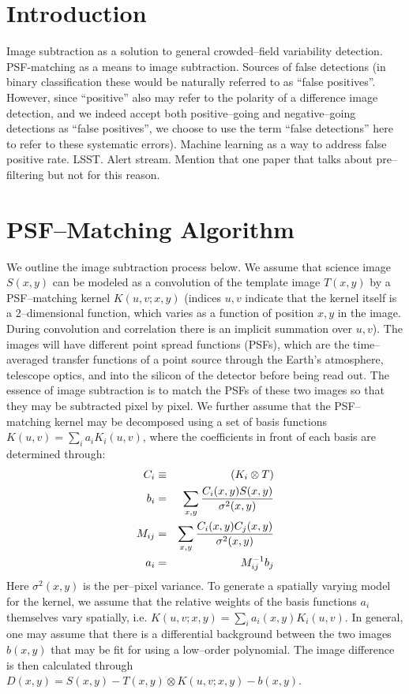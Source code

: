 \documentclass[floatfix, apj]{emulateapj}
\begin{document}

\section{Introduction}

Image subtraction as a solution to general crowded--field variability detection.
PSF-matching as a means to image subtraction.
Sources of false detections (in binary classification these would be naturally referred to as ``false positives''.  However, since ``positive'' also may refer to the polarity of a difference image detection, and we indeed accept both positive--going and negative--going detections as ``false positives'', we choose to use the term ``false detections'' here to refer to these systematic errors).
Machine learning as a way to address false positive rate.
LSST.
Alert stream.
Mention that one paper that talks about pre--filtering but not for this reason.

\section{PSF--Matching Algorithm}

We outline the image subtraction process below.
We assume that science image $S(x,y)$ can be modeled as a convolution of the template image $T(x,y)$ by a PSF--matching kernel $K(u,v;x,y)$ (indices $u,v$ indicate that the kernel itself is a 2--dimensional function, which varies as a function of position $x,y$ in the image.
During convolution and correlation there is an implicit summation over $u,v$).
The images will have different point spread functions (PSFs), which are the time--averaged transfer functions of a point source through the Earth's atmosphere, telescope optics, and into the silicon of the detector before being read out.
The essence of image subtraction is to match the PSFs of these two images so that they may be subtracted pixel by pixel.
We further assume that the PSF--matching kernel may be decomposed using a set of basis functions $K(u,v) = \sum_i a_i K_i(u,v)$, where the coefficients in front of each basis are determined through:
\begin{eqnarray}
\label{eq-soln}
C_i & \equiv & (K_i \otimes T) \\ 
b_{i}  & = & \sum_{x,y} {{C_i(x,y) S(x,y)}\over{\sigma^2(x,y)}}   \nonumber \\
M_{ij} & = & \sum_{x,y} {{C_i(x,y) C_j(x,y)}\over{\sigma^2(x,y)}}  \nonumber \\
a_{i}  & = & M^{-1}_{ij} b_{j} \nonumber
\end{eqnarray}
Here $\sigma^2(x,y)$ is the per--pixel variance.
To generate a spatially varying model for the kernel, we assume that the relative weights of the basis functions $a_i$ themselves vary spatially, i.e. $K(u,v;x,y) = \sum_i a_i(x,y) K_i(u,v)$.
In general, one may assume that there is a differential background between the two images $b(x,y)$ that may be fit for using a low--order polynomial.
The image difference is then calculated through $D(x,y) = S(x,y) - T(x,y) \otimes K(u,v;x,y) - b(x,y)$.
\end{document}
